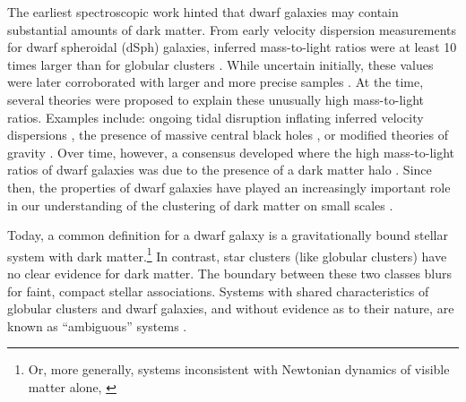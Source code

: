 The earliest spectroscopic work hinted that dwarf galaxies may contain
substantial amounts of dark matter. From early velocity dispersion
measurements for dwarf spheroidal (dSph) galaxies, inferred
mass-to-light ratios were at least 10 times larger than for globular
clusters \citep[e.g.,][]{aaronson1983, aaronson+olszewski1987}. While
uncertain initially, these values were later corroborated with larger
and more precise samples \citep[e.g.,][]{hargreaves+1994}. At the time,
several theories were proposed to explain these unusually high
mass-to-light ratios. Examples include: ongoing tidal disruption
inflating inferred velocity dispersions
\citep[e.g.,][]{kuhn+miller1989}, the presence of massive central black
holes \citep[e.g.,][]{strobel+lake1994}, or modified theories of gravity
\citep{milgrom1995}. Over time, however, a consensus developed where the
high mass-to-light ratios of dwarf galaxies was due to the presence of a
dark matter halo \citep[e.g.,][]{dekel+silk1986, wechsler+tinker2018}.
Since then, the properties of dwarf galaxies have played an increasingly
important role in our understanding of the clustering of dark matter on
small scales \citep[e.g.,][]{sales+2022, bullock+boylan-kolchin2017}.

Today, a common definition for a dwarf galaxy is a gravitationally bound
stellar system with dark matter.\footnote{Or, more generally, systems
  inconsistent with Newtonian dynamics of visible matter alone,
  \citet{willman+strader2012}} In contrast, star clusters (like globular
clusters) have no clear evidence for dark matter. The boundary between
these two classes blurs for faint, compact stellar associations. Systems
with shared characteristics of globular clusters and dwarf galaxies, and
without evidence as to their nature, are known as ``ambiguous'' systems
\citep[e.g.,][]{smith+2024}.

